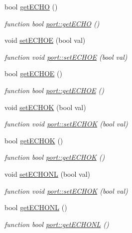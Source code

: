 \begin{DoxyCompactItemize}
bool \hyperlink{classport_af6aaa84a4759991f80963c457530e151}{get\+E\+C\+HO} ()
\begin{DoxyCompactList}\small\item\em function bool \hyperlink{classport_af6aaa84a4759991f80963c457530e151}{port\+::get\+E\+C\+HO} () \end{DoxyCompactList}\item 
void \hyperlink{classport_a0ae016ddf513a4dec27e7fb4e91a45a1}{set\+E\+C\+H\+OE} (bool val)
\begin{DoxyCompactList}\small\item\em function void \hyperlink{classport_a0ae016ddf513a4dec27e7fb4e91a45a1}{port\+::set\+E\+C\+H\+OE} (bool val) \end{DoxyCompactList}\item 
bool \hyperlink{classport_a54f8ecafc33c840d4d4a7bd928968916}{get\+E\+C\+H\+OE} ()
\begin{DoxyCompactList}\small\item\em function bool \hyperlink{classport_a54f8ecafc33c840d4d4a7bd928968916}{port\+::get\+E\+C\+H\+OE} () \end{DoxyCompactList}\item 
void \hyperlink{classport_abf70fa210c1c01f08868526c908042fd}{set\+E\+C\+H\+OK} (bool val)
\begin{DoxyCompactList}\small\item\em function void \hyperlink{classport_abf70fa210c1c01f08868526c908042fd}{port\+::set\+E\+C\+H\+OK} (bool val) \end{DoxyCompactList}\item 
bool \hyperlink{classport_af358e760f826378bdbff0c338b3561aa}{get\+E\+C\+H\+OK} ()
\begin{DoxyCompactList}\small\item\em function bool \hyperlink{classport_af358e760f826378bdbff0c338b3561aa}{port\+::get\+E\+C\+H\+OK} () \end{DoxyCompactList}\item 
void \hyperlink{classport_a96a45d5c9d0e6c3546be94a8477a03d9}{set\+E\+C\+H\+O\+NL} (bool val)
\begin{DoxyCompactList}\small\item\em function void \hyperlink{classport_abf70fa210c1c01f08868526c908042fd}{port\+::set\+E\+C\+H\+OK} (bool val) \end{DoxyCompactList}\item 
bool \hyperlink{classport_a0ed3a5bcfe7dc3f3d0425ccda06d68a3}{get\+E\+C\+H\+O\+NL} ()
\begin{DoxyCompactList}\small\item\em function bool \hyperlink{classport_a0ed3a5bcfe7dc3f3d0425ccda06d68a3}{port\+::get\+E\+C\+H\+O\+NL} () \end{DoxyCompactList}\item 

\end{DoxyCompactItemize}
